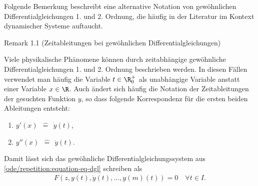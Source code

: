 \documentclass[letterpaper,10pt,english]{jupyterBook}
\begin{document}
\par
Folgende Bemerkung beschreibt eine alternative Notation von gewöhnlichen Differentialgleichungen 1. und 2. Ordnung, die häufig in der Literatur im Kontext dynamischer Systeme auftaucht.
\label{ode/repetition:remark-1}
\begin{emphBox}{}{}{Remark 1.1 (Zeitableitungen bei gewöhnlichen Differentialgleichungen)}



\par
Viele physikalische Phänomene können durch zeitabhängige gewöhnliche Differentialgleichungen 1. und 2. Ordnung beschrieben werden.
In diesen Fällen verwendet man häufig die Variable \(t \in \R^+_0\) als unabhängige Variable anstatt einer Variable \(x \in \R\).
Auch ändert sich häufig die Notation der Zeitableitungen der gesuchten Funktion \(y\), so dass folgende Korrespondenz für die ersten beiden Ableitungen entsteht:
\begin{enumerate}

\item {} 
\par
\(y'(x) \ \ \hat{=} \ \ \dot{y}(t)\),

\item {} 
\par
\(y''(x) \ \ \hat{=} \ \ \ddot{y}(t)\).

\end{enumerate}

\par
Damit lässt sich das gewöhnliche Differentialgleichungssystem aus \cref{ode/repetition:equation-eq-dgl} schreiben als
\begin{align}\label{equation:ode/repetition:eq:DGL_time}
F(z, y(t), \dot{y}(t), \ldots, y{(m)}(t)) = 0 \quad \forall t\in I.
\end{align}\end{emphBox}
\end{document}
